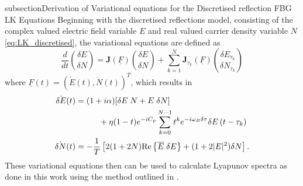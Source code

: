 %
%
subsection{Derivation of Variational equations for the Discretised reflection FBG LK Equations}
\label{app:lyapunov}
%
Beginning with the discretised reflections model, consisting of the complex valued electric field variable $E$ and real valued carrier density variable $N$ \eqref{eq:LK_discretised}, the variational equations are defined as
%
\begin{equation}
    \frac{d}{d t}\binom{\delta E}{\delta N} = \mathbf{J}(\underline{F})\binom{\delta E}{\delta N} + \sum_{k=1}^{N}\mathbf{J}_{\tau_{k}}(\underline{F})\binom{\delta E_{\tau_{k}}}{\delta N_{\tau_{k}}}
\end{equation}
%
where $\underline{F}(t)=(\dot{E}(t), \dot{N}(t))^T$, which results in
%
\begin{gather}
\begin{aligned}
    \label{eq:variational}
    \dot{\delta E}(t) &= (1+i \alpha)[\delta E \; N + E \; \delta N]\\
                &\hspace{1cm} + \eta(1-t) e^{-i C_p} \sum_{k=0}^{N-1} t^{k} e^{-i \omega_B \delta \tau} \delta E\left(t-\tau_{k}\right) \\
    \dot{\delta N}(t) &=-\frac{1}{T}\left[2(1+2 N) \text{Re}\left\{\overline{E} \; \delta E\right\} + (1+2|E|^{2} ) \delta N \right].
\end{aligned}
\end{gather}
%
These variational equations then can be used to calculate Lyapunov spectra as done in this work using the method outlined in \cite{farmer1982chaotic}.
